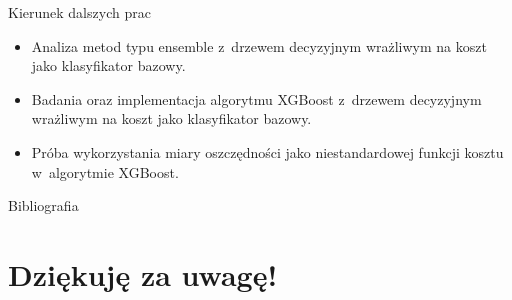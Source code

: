 \documentclass{beamer}
\begin{document}
\begin{frame}{Kierunek dalszych prac}
	\begin{itemize}
		\item Analiza metod typu ensemble z~drzewem decyzyjnym wrażliwym na koszt jako klasyfikator bazowy.
		\item Badania oraz implementacja algorytmu XGBoost z~drzewem decyzyjnym wrażliwym na koszt jako klasyfikator bazowy.
		\item Próba wykorzystania miary oszczędności jako niestandardowej funkcji kosztu w~algorytmie XGBoost.  
	\end{itemize}
\end{frame}

\begin{frame}{Bibliografia}
	\nocite{CSCCFD}
	\nocite{ICCFD}
	\nocite{EDCSLR}
	
	
	
\end{frame}

\section[]{Dziękuję za uwagę!}
\end{document}
